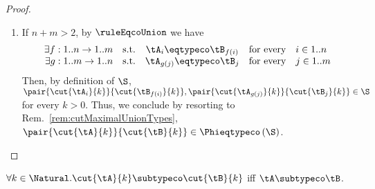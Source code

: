 \begin{proof}
\begin{enumerate}
  \item If $n + m > 2$, by $\ruleEqcoUnion$ we have $$
\begin{array}{r@{\quad\text{s.t.}\quad}c@{\quad\text{for every}\quad}l}
\exists f : 1..n \to 1..m & \tA_i \eqtypeco \tB_{f(i)} & i \in 1..n \\
\exists g : 1..m \to 1..n & \tA_{g(j)} \eqtypeco \tB_j & j \in 1..m
\end{array} $$
  Then, by definition of $\S$, $\pair{\cut{\tA_i}{k}}{\cut{\tB_{f(i)}}{k}},
  \pair{\cut{\tA_{g(j)}}{k}}{\cut{\tB_j}{k}} \in \S$ for every $k > 0$. Thus,
  we conclude by resorting to Rem.~\ref{rem:cutMaximalUnionTypes},
  $\pair{\cut{\tA}{k}}{\cut{\tB}{k}} \in \Phieqtypeco\left(\S\right)$.
\end{enumerate}
\end{proof}



\begin{lemma}
\label{lem:cutSubtypingCo}
$\forall k \in \Natural.\cut{\tA}{k} \subtypeco \cut{\tB}{k}$ iff $\tA \subtypeco \tB$.
\end{lemma}

